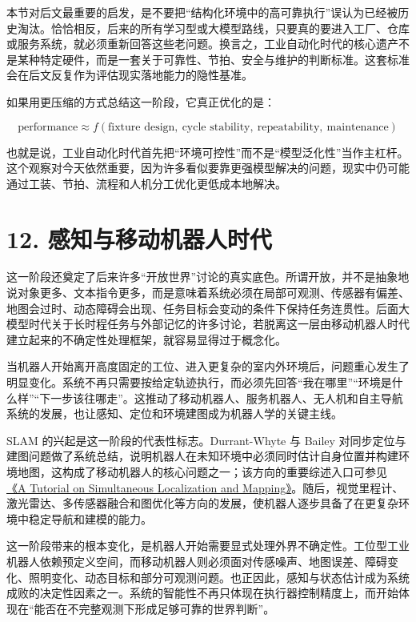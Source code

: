 本节对后文最重要的启发，是不要把“结构化环境中的高可靠执行”误认为已经被历史淘汰。恰恰相反，后来的所有学习型或大模型路线，只要真的要进入工厂、仓库或服务系统，就必须重新回答这些老问题。换言之，工业自动化时代的核心遗产不是某种特定硬件，而是一套关于可靠性、节拍、安全与维护的判断标准。这套标准会在后文反复作为评估现实落地能力的隐性基准。

如果用更压缩的方式总结这一阶段，它真正优化的是：

\begingroup
\scriptsize
\begin{equation*}
\text{performance} \approx f(\text{fixture design},\ \text{cycle stability},\ \text{repeatability},\ \text{maintenance})
\end{equation*}
\endgroup

也就是说，工业自动化时代首先把“环境可控性”而不是“模型泛化性”当作主杠杆。这个观察对今天依然重要，因为许多看似要靠更强模型解决的问题，现实中仍可能通过工装、节拍、流程和人机分工优化更低成本地解决。

\section*{12. 感知与移动机器人时代}

这一阶段还奠定了后来许多“开放世界”讨论的真实底色。所谓开放，并不是抽象地说对象更多、文本指令更多，而是意味着系统必须在局部可观测、传感器有偏差、地图会过时、动态障碍会出现、任务目标会变动的条件下保持任务连贯性。后面大模型时代关于长时程任务与外部记忆的许多讨论，若脱离这一层由移动机器人时代建立起来的不确定性处理框架，就容易显得过于概念化。

当机器人开始离开高度固定的工位、进入更复杂的室内外环境后，问题重心发生了明显变化。系统不再只需要按给定轨迹执行，而必须先回答“我在哪里”“环境是什么样”“下一步该往哪走”。这推动了移动机器人、服务机器人、无人机和自主导航系统的发展，也让感知、定位和环境建图成为机器人学的关键主线。

SLAM 的兴起是这一阶段的代表性标志。Durrant-Whyte 与 Bailey 对同步定位与建图问题做了系统总结，说明机器人在未知环境中必须同时估计自身位置并构建环境地图，这构成了移动机器人的核心问题之一；该方向的重要综述入口可参见 \href{https://ieeexplore.ieee.org/document/1638022}{《A Tutorial on Simultaneous Localization and Mapping》}。随后，视觉里程计、激光雷达、多传感器融合和图优化等方向的发展，使机器人逐步具备了在更复杂环境中稳定导航和建模的能力。

这一阶段带来的根本变化，是机器人开始需要显式处理外界不确定性。工位型工业机器人依赖预定义空间，而移动机器人则必须面对传感噪声、地图误差、障碍变化、照明变化、动态目标和部分可观测问题。也正因此，感知与状态估计成为系统成败的决定性因素之一。系统的智能性不再只体现在执行器控制精度上，而开始体现在“能否在不完整观测下形成足够可靠的世界判断”。

